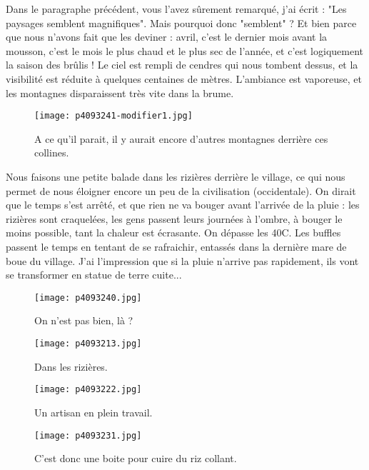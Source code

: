 \documentclass{book}
\begin{document}
Dans le paragraphe précédent, vous l'avez sûrement remarqué, j'ai écrit : "Les paysages semblent  magnifiques". Mais pourquoi donc "semblent" ? Et bien parce que nous n'avons fait que les deviner : avril, c'est le dernier mois avant la mousson, c'est le mois le plus chaud et le plus sec de l'année, et c'est logiquement la saison des brûlis ! Le ciel est rempli de cendres qui nous tombent dessus, et la visibilité est réduite à quelques centaines de mètres. L'ambiance est vaporeuse, et les montagnes disparaissent très vite dans la brume.


\begin{figure}[h]
\centering
\texttt{[image: p4093241-modifier1.jpg]}
\caption*{A ce qu'il parait, il y aurait encore d'autres montagnes derrière ces collines.}
\end{figure}

Nous faisons une petite balade dans les rizières derrière le village, ce qui nous permet de nous éloigner encore un peu de la civilisation (occidentale). On dirait que le temps s'est arrêté, et que rien ne va bouger avant l'arrivée de la pluie : les rizières sont craquelées, les gens passent leurs journées à l'ombre, à bouger le moins possible, tant la chaleur est écrasante. On dépasse les 40\textdegree C. Les buffles passent le temps en tentant de se rafraichir, entassés dans la dernière mare de boue du village. J'ai l'impression que si la pluie n'arrive pas rapidement, ils vont se transformer en statue de terre cuite...




\begin{figure}[h]
\centering
\texttt{[image: p4093240.jpg]}
\caption*{On n'est pas bien, là ?}
\end{figure}


\begin{figure}[h]
\centering
\texttt{[image: p4093213.jpg]}
\caption*{Dans les rizières.}
\end{figure}


\begin{figure}[h]
\centering
\texttt{[image: p4093222.jpg]}
\caption*{Un artisan en plein travail.}
\end{figure}


\begin{figure}[h]
\centering
\texttt{[image: p4093231.jpg]}
\caption*{C'est donc une boite pour cuire du riz collant.}
\end{figure}
\end{document}
